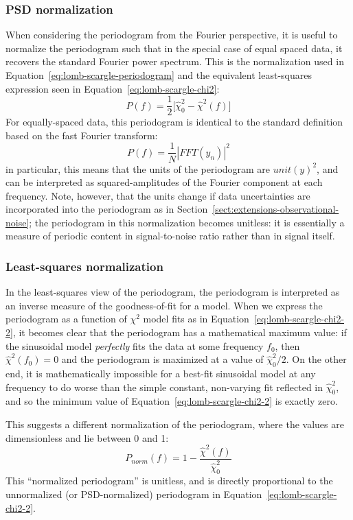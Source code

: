 \documentclass[preprint]{aastex}
\newcommand{\Eq}[1]{Equation~\ref{eq:#1}}
\newcommand{\eq}[1]{\Eq{#1}}
\newcommand{\eqlabel}[1]{\label{eq:#1}}
\newcommand{\Sect}[1]{Section~\ref{sect:#1}}
\newcommand{\sect}[1]{\Sect{#1}}
\begin{document}
\subsubsection{PSD normalization}
When considering the periodogram from the Fourier perspective,
it is useful to normalize the periodogram such that in the special case
of equal spaced data, it recovers the standard Fourier power spectrum.
This is the normalization used in \eq{lomb-scargle-periodogram} and the
equivalent least-squares expression seen in \eq{lomb-scargle-chi2}:
\begin{equation}
  P(f) = \frac{1}{2}\big[\hat{\chi}^2_0 - \hat{\chi}^2(f)\big]
  \eqlabel{lomb-scargle-chi2-2}
\end{equation}
For equally-spaced data, this periodogram is identical to the standard
definition based on the fast Fourier transform:
\begin{equation}
  P(f) = \frac{1}{N} \left| FFT(y_n) \right|^2
\end{equation}
in particular, this means that the units of the periodogram are $unit(y)^2$,
and can be interpreted as squared-amplitudes of the Fourier component at
each frequency.
Note, however, that the units change if data uncertainties are incorporated
into the periodogram as in \sect{extensions-observational-noise};
the periodogram in this normalization becomes unitless: it is essentially
a measure of periodic content in signal-to-noise ratio
rather than in signal itself.

\subsubsection{Least-squares normalization}
In the least-squares view of the periodogram, the periodogram is interpreted
as an inverse measure of the goodness-of-fit for a model.
When we express the periodogram as a function of $\chi^2$ model fits as in
\eq{lomb-scargle-chi2-2}, it becomes clear that the periodogram has a
mathematical maximum value: if the sinusoidal model {\it perfectly} fits
the data at some frequency $f_0$, then $\hat{\chi}^2(f_0) = 0$ and the
periodogram is maximized at a value of $\hat{\chi}^2_0 / 2$.
On the other end, it is mathematically impossible for a best-fit sinusoidal
model at any frequency to do worse than the simple constant, non-varying
fit reflected in $\hat{\chi}^2_0$, and so the minimum value of
\eq{lomb-scargle-chi2-2} is exactly zero.

This suggests a different normalization of the periodogram, where the values
are dimensionless and lie between 0 and 1:
\begin{equation}
  P_{norm}(f) = 1 - \frac{\hat{\chi}^2(f)}{\hat{\chi}^2_0}
  \eqlabel{lomb-scargle-normalized}
\end{equation}
This ``normalized periodogram'' is unitless, and
is directly proportional to the unnormalized
(or PSD-normalized) periodogram in \eq{lomb-scargle-chi2-2}.
\end{document}
